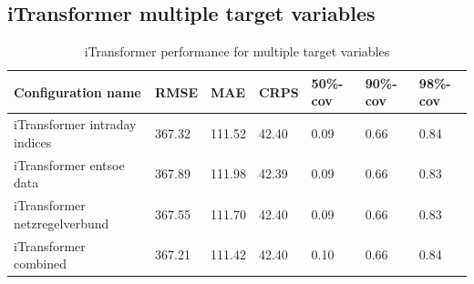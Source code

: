 \documentclass[class=scrbook, crop=false]{standalone}
\begin{document}
\subsection{iTransformer multiple target variables}

 \begin{table}[]
\centering
\begin{tabular}{l|l|l|l|l|l|l}
 Configuration name			&  RMSE 	& MAE 	& CRPS 	& 50\%-cov & 90\%-cov & 98\%-cov \\\hline
 iTransformer intraday indices 		& 367.32	&111.52	&42.40	&0.09			& 0.66	 & 0.84 \\
 iTransformer entsoe data		&  367.89	& 111.98 	&42.39	&0.09			& 0.66	 &0.83 \\
 iTransformer netzregelverbund 	& 367.55 	& 111.70	& 42.40	&0.09		 &0.66	 & 0.83\\
 iTransformer combined 		& 367.21 	& 111.42	& 42.40	& 0.10	 &0.66	 & 0.84\\
\end{tabular}
\caption{iTransformer performance for multiple target variables}
\label{Table::Performance_targets}
\end{table}
\end{document}
